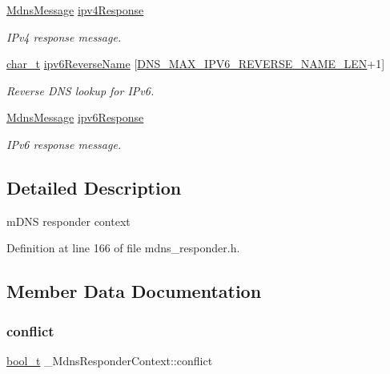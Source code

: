 \begin{DoxyCompactItemize}
\hyperlink{structMdnsMessage}{Mdns\+Message} \hyperlink{struct__MdnsResponderContext_a90ac00203e8f4a2e2a9a76f5722c8a43}{ipv4\+Response}
\begin{DoxyCompactList}\small\item\em I\+Pv4 response message. \end{DoxyCompactList}\item 
\hyperlink{compiler__port_8h_a40bb5262bf908c328fbcfbe5d29d0201}{char\+\_\+t} \hyperlink{struct__MdnsResponderContext_a5f486a77d63fd4487fd773804372b65a}{ipv6\+Reverse\+Name} \mbox{[}\hyperlink{dns__common_8h_a6939038546924e6710db5507081a44fd}{D\+N\+S\+\_\+\+M\+A\+X\+\_\+\+I\+P\+V6\+\_\+\+R\+E\+V\+E\+R\+S\+E\+\_\+\+N\+A\+M\+E\+\_\+\+L\+EN}+1\mbox{]}
\begin{DoxyCompactList}\small\item\em Reverse D\+NS lookup for I\+Pv6. \end{DoxyCompactList}\item 
\hyperlink{structMdnsMessage}{Mdns\+Message} \hyperlink{struct__MdnsResponderContext_afdc0707e2c83347da49942bf1a47fc56}{ipv6\+Response}
\begin{DoxyCompactList}\small\item\em I\+Pv6 response message. \end{DoxyCompactList}\end{DoxyCompactItemize}


\subsection{Detailed Description}
m\+D\+NS responder context 

Definition at line 166 of file mdns\+\_\+responder.\+h.



\subsection{Member Data Documentation}
\mbox{\label{struct__MdnsResponderContext_a1dc6910f8d96e700d0ca5a040410d0bd}} 
\subsubsection{\texorpdfstring{conflict}{conflict}}
{\footnotesize\ttfamily \hyperlink{compiler__port_8h_a812d16e5494522586b3784e55d479912}{bool\+\_\+t} \+\_\+\+Mdns\+Responder\+Context\+::conflict}



